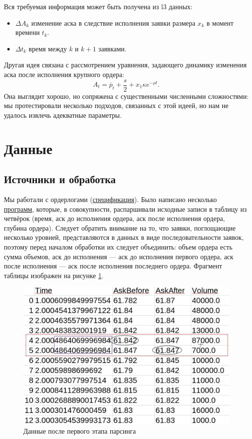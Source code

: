 Вся требуемая информация может быть получена из l3 данных: 
\begin{itemize}
    \item $\Delta A_{k}$ изменение аска в следствие исполнения заявки размера $x_k$ в момент времени $t_k$.
    \item $\Delta t_{k}$ время между $k$ и $k + 1$ заявками.
\end{itemize}

Другая идея связана с рассмотрением уравнения, задающего динамику изменения аска после исполнения крупного ордера:
\begin{equation*}
        A_t = \overline p _t + \frac{s}{2} + x_1 \kappa e^{- \rho t}.
\end{equation*}
Она выглядит хорошо, но сопряжена с существенными численными сложностями: мы протестировали несколько подходов, связанных
с этой идеей, но нам не удалось извлечь адекватные параметры.



\section{Данные}
\subsection{Источники и обработка}
Мы работали с ордерлогами (\href{https://fs.moex.com/f/3198/specifikacija-formata-dannyh.pdf}{спецификация}). Было написано несколько 
\href{https://github.com/VsevolodZaostrovsky/OWModel/tree/main/New%20data/data%20preparing}{программ},
которые, в совокупности, распаршивали исходные записи в таблицу из четвёрок (время, аск до исполнения ордера, аск после исполнения ордера, глубина ордера). 
Следует обратить внимание на то, что заявки, поглощающие несколько уровней, представляются в данных в виде последовательности заявок, поэтому 
перед началом обработки их следует объединить: объем ордера есть сумма объемов, аск до исполнения --- аск до исполнения первого ордера,
аск после исполнения --- аск после исполнения последнего ордера. Фрагмент таблицы изображен на рисунке \ref{datacsv}.
\begin{figure}
    \includegraphics[scale=0.35]{fig/datscsv.jpg}
    \caption{Данные после первого этапа парсинга}
    \label{datacsv}
\end{figure}


